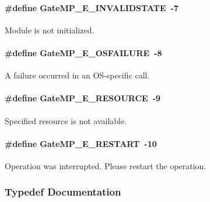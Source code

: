 \paragraph[{GateMP\_\-E\_\-INVALIDSTATE}]{\setlength{\rightskip}{0pt plus 5cm}\#define GateMP\_\-E\_\-INVALIDSTATE~-\/7}\hfill\label{_gate_m_p_8h_a075d7c582f213e960e44c25ff138ad85}


Module is not initialized. 

\paragraph[{GateMP\_\-E\_\-OSFAILURE}]{\setlength{\rightskip}{0pt plus 5cm}\#define GateMP\_\-E\_\-OSFAILURE~-\/8}\hfill\label{_gate_m_p_8h_a2eac3b6964fe569e41231fb2fea8b18d}


A failure occurred in an OS-\/specific call. 

\paragraph[{GateMP\_\-E\_\-RESOURCE}]{\setlength{\rightskip}{0pt plus 5cm}\#define GateMP\_\-E\_\-RESOURCE~-\/9}\hfill\label{_gate_m_p_8h_ad07430b772c1d95c5ef2425b6c280fd9}


Specified resource is not available. 

\paragraph[{GateMP\_\-E\_\-RESTART}]{\setlength{\rightskip}{0pt plus 5cm}\#define GateMP\_\-E\_\-RESTART~-\/10}\hfill\label{_gate_m_p_8h_a77205c8c44ab3edc4557cc4521cb3d04}


Operation was interrupted. Please restart the operation. 



\subsubsection{Typedef Documentation}
